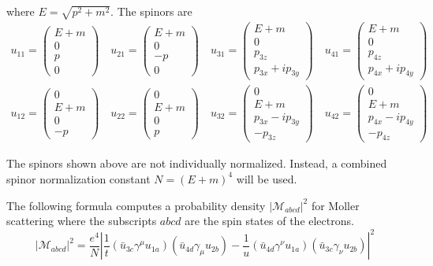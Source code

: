\documentclass[12pt]{article}
\begin{document}
\noindent
where $E=\sqrt{p^2+m^2}$.
The spinors are
\begin{gather*}
u_{11}=\begin{pmatrix}E+m\\0\\p\\0\end{pmatrix}\quad
u_{21}=\begin{pmatrix}E+m\\0\\-p\\0\end{pmatrix}\quad
u_{31}=\begin{pmatrix}E+m\\0\\p_{3z}\\p_{3x}+ip_{3y}\end{pmatrix}\quad
u_{41}=\begin{pmatrix}E+m\\0\\p_{4z}\\p_{4x}+ip_{4y}\end{pmatrix}
\\
u_{12}=\begin{pmatrix}0\\E+m\\0\\-p\end{pmatrix}\quad
u_{22}=\begin{pmatrix}0\\E+m\\0\\p\end{pmatrix}\quad
u_{32}=\begin{pmatrix}0\\E+m\\p_{3x}-ip_{3y}\\-p_{3z}\end{pmatrix}\quad
u_{42}=\begin{pmatrix}0\\E+m\\p_{4x}-ip_{4y}\\-p_{4z}\end{pmatrix}
\end{gather*}

\noindent
The spinors shown above are not individually normalized.
Instead, a combined spinor normalization constant
$N=(E+m)^4$ will be used.

\bigskip
\noindent
The following formula computes a probability density $|\mathcal{M}_{abcd}|^2$
for Moller scattering where the subscripts $abcd$ are the spin states of the electrons.
\begin{equation*}
|\mathcal{M}_{abcd}|^2=\frac{e^4}{N}
\left|
\frac{1}{t}(\bar{u}_{3c}\gamma^\mu u_{1a})(\bar{u}_{4d}\gamma_\mu u_{2b})
-\frac{1}{u}(\bar{u}_{4d}\gamma^\nu u_{1a})(\bar{u}_{3c}\gamma_\nu u_{2b})
\right|^2
\end{equation*}
\end{document}
